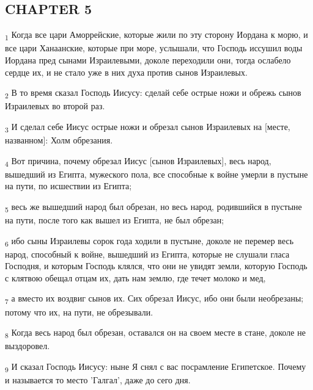 \subsection{CHAPTER 5}
\begin{tcolorbox}
\textsubscript{1} Когда все цари Аморрейские, которые жили по эту сторону Иордана к морю, и все цари Ханаанские, которые при море, услышали, что Господь иссушил воды Иордана пред сынами Израилевыми, доколе переходили они, тогда ослабело сердце их, и не стало уже в них духа против сынов Израилевых.
\end{tcolorbox}
\begin{tcolorbox}
\textsubscript{2} В то время сказал Господь Иисусу: сделай себе острые ножи и обрежь сынов Израилевых во второй раз.
\end{tcolorbox}
\begin{tcolorbox}
\textsubscript{3} И сделал себе Иисус острые ножи и обрезал сынов Израилевых на [месте, названном]: Холм обрезания.
\end{tcolorbox}
\begin{tcolorbox}
\textsubscript{4} Вот причина, почему обрезал Иисус [сынов Израилевых], весь народ, вышедший из Египта, мужеского пола, все способные к войне умерли в пустыне на пути, по исшествии из Египта;
\end{tcolorbox}
\begin{tcolorbox}
\textsubscript{5} весь же вышедший народ был обрезан, но весь народ, родившийся в пустыне на пути, после того как вышел из Египта, не был обрезан;
\end{tcolorbox}
\begin{tcolorbox}
\textsubscript{6} ибо сыны Израилевы сорок года ходили в пустыне, доколе не перемер весь народ, способный к войне, вышедший из Египта, которые не слушали гласа Господня, и которым Господь клялся, что они не увидят земли, которую Господь с клятвою обещал отцам их, дать нам землю, где течет молоко и мед,
\end{tcolorbox}
\begin{tcolorbox}
\textsubscript{7} а вместо их воздвиг сынов их. Сих обрезал Иисус, ибо они были необрезаны; потому что их, на пути, не обрезывали.
\end{tcolorbox}
\begin{tcolorbox}
\textsubscript{8} Когда весь народ был обрезан, оставался он на своем месте в стане, доколе не выздоровел.
\end{tcolorbox}
\begin{tcolorbox}
\textsubscript{9} И сказал Господь Иисусу: ныне Я снял с вас посрамление Египетское. Почему и называется то место 'Галгал', даже до сего дня.
\end{tcolorbox}
